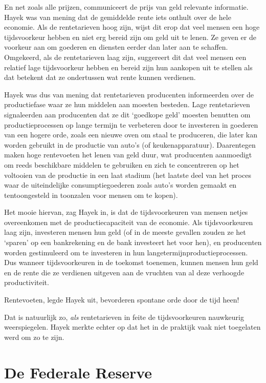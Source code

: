 \documentclass[smalldemyvopaper,11pt,twoside,onecolumn,openright,extrafontsizes,hidelinks]{memoir}
\begin{document}
En net zoals alle prijzen, communiceert de prijs van geld relevante
informatie. Hayek was van mening dat de gemiddelde rente iets onthult
over de hele economie. Als de rentetarieven hoog zijn, wijst dit erop
dat veel mensen een hoge tijdsvoorkeur hebben en niet erg bereid zijn om
geld uit te lenen. Ze geven er de voorkeur aan om goederen en diensten
eerder dan later aan te schaffen. Omgekeerd, als de rentetarieven laag
zijn, suggereert dit dat veel mensen een relatief lage tijdsvoorkeur
hebben en bereid zijn hun aankopen uit te stellen als dat betekent dat
ze ondertussen wat rente kunnen verdienen.

Hayek was dus van mening dat rentetarieven producenten informeerden over
de productiefase waar ze hun middelen aan moesten besteden. Lage
rentetarieven signaleerden aan producenten dat ze dit `goedkope geld'
moesten benutten om productieprocessen op lange termijn te verbeteren
door te investeren in goederen van een hogere orde, zoals een nieuwe
oven om staal te produceren, die later kan worden gebruikt in de
productie van auto's (of keukenapparatuur). Daarentegen maken hoge
rentevoeten het lenen van geld duur, wat producenten aanmoedigt om reeds
beschikbare middelen te gebruiken en zich te concentreren op het
voltooien van de productie in een laat stadium (het laatste deel van het
proces waar de uiteindelijke consumptiegoederen zoals auto's worden
gemaakt en tentoongesteld in toonzalen voor mensen om te kopen).

Het mooie hiervan, zag Hayek in, is dat de tijdsvoorkeuren van mensen
netjes overeenkomen met de productiecapaciteit van de economie. Als
tijdsvoorkeuren laag zijn, investeren mensen hun geld (of in de meeste
gevallen zouden ze het `sparen' op een bankrekening en de bank
investeert het voor hen), en producenten worden gestimuleerd om te
investeren in hun langetermijnproductieprocessen. Dus wanneer
tijdsvoorkeuren in de toekomst toenemen, kunnen mensen hun geld en de
rente die ze verdienen uitgeven aan de vruchten van al deze verhoogde
productiviteit.

Rentevoeten, legde Hayek uit, bevorderen spontane orde door de tijd
heen!

Dat is natuurlijk zo, \emph{als} rentetarieven in feite de
tijdsvoorkeuren nauwkeurig weerspiegelen. Hayek merkte echter op dat het
in de praktijk vaak niet toegelaten werd om zo te zijn.

\section{De Federale Reserve}\label{de-federale-reserve}
\end{document}
